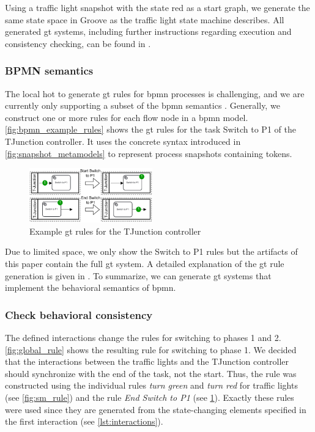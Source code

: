 \documentclass{jot}
\begin{document}
Using a traffic light snapshot with the state red as a start graph, we generate the same state space in Groove as the traffic light state machine describes.
All generated \gls*{gt} systems, including further instructions regarding execution and consistency checking, can be found in \cite{krauterArtifactsBehavioralConsistency2022}.


\subsubsection{BPMN semantics}
The local \gls*{hot} to generate \gls*{gt} rules for \gls*{bpmn} processes is challenging, and we are currently only supporting a subset of the \gls*{bpmn} semantics \cite{krauterFormalizationAnalysisBPMN2022}.
Generally, we construct one or more rules for each flow node in a \gls*{bpmn} model.
\autoref{fig:bpmn_example_rules} shows the \gls*{gt} rules for the task \textsf{Switch to P1} of the TJunction controller.
It uses the concrete syntax introduced in \cref{fig:snapshot_metamodels} to represent process snapshots containing tokens.

\begin{figure}[h]
    \centering
    \includegraphics[width=0.475\textwidth]{figures/bpmn_rules.pdf}
    \caption{Example \gls*{gt} rules for the TJunction controller}
    \label{fig:bpmn_example_rules}
\end{figure}

Due to limited space, we only show the \textsf{Switch to P1} rules but the artifacts of this paper \cite{krauterArtifactsBehavioralConsistency2022} contain the full \gls*{gt} system.
A detailed explanation of the \gls*{gt} rule generation is given in \cite{krauterFormalizationAnalysisBPMN2022}.
To summarize, we can generate \gls*{gt} systems that implement the behavioral semantics of \gls*{bpmn}.


\subsubsection{Check behavioral consistency}
The defined interactions change the rules for switching to phases 1 and 2.
\autoref{fig:global_rule} shows the resulting rule for switching to phase 1.
We decided that the interactions between the traffic lights and the TJunction controller should synchronize with the end of the task, not the start.
Thus, the rule was constructed using the individual rules \textit{turn green} and \textit{turn red} for traffic lights (see \cref{fig:sm_rule}) and the rule \textit{End Switch to P1} (see \cref{fig:bpmn_example_rules}).
Exactly these rules were used since they are generated from the state-changing elements specified in the first interaction (see \cref{lst:interactions}).
\end{document}
